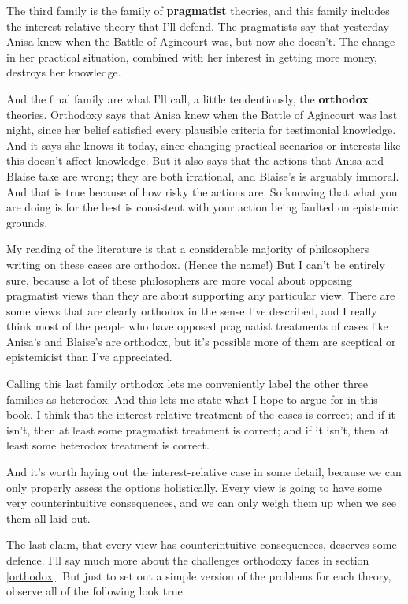 \documentclass[
  11pt,
]{book}
\begin{document}
The third family is the family of \textbf{pragmatist} theories, and this family includes the interest-relative theory that I'll defend. The pragmatists say that yesterday Anisa knew when the Battle of Agincourt was, but now she doesn't. The change in her practical situation, combined with her interest in getting more money, destroys her knowledge.

And the final family are what I'll call, a little tendentiously, the \textbf{orthodox} theories. Orthodoxy says that Anisa knew when the Battle of Agincourt was last night, since her belief satisfied every plausible criteria for testimonial knowledge. And it says she knows it today, since changing practical scenarios or interests like this doesn't affect knowledge. But it also says that the actions that Anisa and Blaise take are wrong; they are both irrational, and Blaise's is arguably immoral. And that is true because of how risky the actions are. So knowing that what you are doing is for the best is consistent with your action being faulted on epistemic grounds.

My reading of the literature is that a considerable majority of philosophers writing on these cases are orthodox. (Hence the name!) But I can't be entirely sure, because a lot of these philosophers are more vocal about opposing pragmatist views than they are about supporting any particular view. There are some views that are clearly orthodox in the sense I've described, and I really think most of the people who have opposed pragmatist treatments of cases like Anisa's and Blaise's are orthodox, but it's possible more of them are sceptical or epistemicist than I've appreciated.

Calling this last family orthodox lets me conveniently label the other three families as heterodox. And this lets me state what I hope to argue for in this book. I think that the interest-relative treatment of the cases is correct; and if it isn't, then at least some pragmatist treatment is correct; and if it isn't, then at least some heterodox treatment is correct.

And it's worth laying out the interest-relative case in some detail, because we can only properly assess the options holistically. Every view is going to have some very counterintuitive consequences, and we can only weigh them up when we see them all laid out.

The last claim, that every view has counterintuitive consequences, deserves some defence. I'll say much more about the challenges orthodoxy faces in section \ref{orthodox}. But just to set out a simple version of the problems for each theory, observe all of the following look true.
\end{document}
